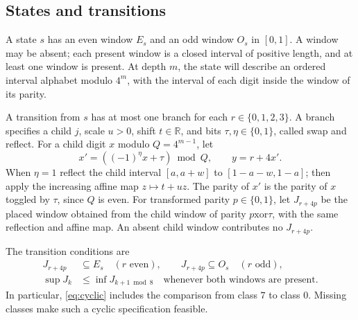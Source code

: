 \documentclass[11pt]{article}
\theoremstyle{definition}
\theoremstyle{remark}
\newcommand{\R}{\mathbb R}
\begin{document}
\subsection{States and transitions}
A state $s$ has an even window $E_s$ and an odd window $O_s$ in $[0,1]$.
A window may be absent; each present window is a closed interval of
positive length, and at least one window is present. At depth $m$, the
state will describe an ordered interval alphabet modulo $4^m$, with the
interval of each digit inside the window of its parity.

A transition from $s$ has at most one branch for each $r\in\{0,1,2,3\}$.
A branch specifies a child $j$, scale $u>0$, shift $t\in\R$, and bits
$\tau,\eta\in\{0,1\}$, called swap and reflect. For a child digit $x$
modulo $Q=4^{m-1}$, let
\begin{equation}\label{eq:binarydigit}
 x'=((-1)^\eta x+\tau)\bmod Q,\qquad y=r+4x'.
\end{equation}
When $\eta=1$ reflect the child interval $[a,a+w]$ to
$[1-a-w,1-a]$; then apply the increasing affine map $z\mapsto t+uz$.
The parity of $x'$ is the parity of $x$ toggled by $\tau$, since $Q$ is
even. For transformed parity $p\in\{0,1\}$, let $J_{r+4p}$ be the
placed window obtained from the child window of parity $p\mathbin{\mathrm{xor}}\tau$,
with the same reflection and affine map. An absent child window contributes
no $J_{r+4p}$.

The transition conditions are
\begin{align}
 J_{r+4p}&\subseteq E_s\quad(r\text{ even}),\qquad
 J_{r+4p}\subseteq O_s\quad(r\text{ odd}),\label{eq:containment}\\
 \sup J_k&\le\inf J_{k+1\bmod8}
 \quad\text{whenever both windows are present}.\label{eq:cyclic}
\end{align}
In particular, \eqref{eq:cyclic} includes the comparison from class $7$
to class $0$. Missing classes make such a cyclic specification feasible.
\end{document}
